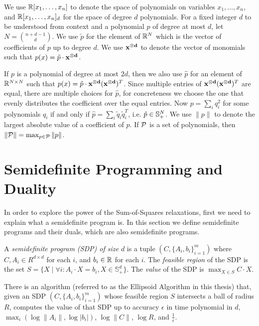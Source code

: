 We use $\mathbb R[x_1,\dots,x_n]$ to denote the space of polynomials on variables $x_1,\dots,x_n$, and $\mathbb R[x_1,\dots,x_n]_d$ for the space of degree $d$ polynomials.
For a fixed integer $d$ to be understood from context and a polynomial $p$ of degree at most $d$, let $N = \binom{n+d-1}{d}$. We use $\tilde{p}$ for the element of $\mathbb R^{N}$ which is the vector of coefficients of $p$ up to degree $d$. We use $\mathbf{x^{\otimes d}}$ to denote the vector of monomials such that $p(x) = \tilde{p} \cdot \mathbf{x^{\otimes d}}$.

If $p$ is a polynomial of degree at most $2d$, then we also use $\hat{p}$ for an element of $\mathbb R^{N \times N}$ such that $p(x) = \hat{p} \cdot \mathbf{x^{\otimes d}}(\mathbf{x^{\otimes d}})^T$. Since multiple entries of $\mathbf{x^{\otimes d}}(\mathbf{x^{\otimes d}})^T$ are equal, there are multiple choices for $\hat{p}$, for concreteness we choose the one that evenly distributes the coefficient over the equal entries. Now $p = \sum_i q_i^2$ for some polynomials $q_i$ if and only if $\hat{p} = \sum_i \tilde{q}_i\tilde{q}_i^T$, i.e. $\hat{p} \in \mathbb{S}^{N}_+$. We use $\|p\|$ to denote the largest absolute value of a coefficient of $p$. If $\mathcal P$ is a set of polynomials, then $\|\mathcal P\| = \max_{p \in \mathcal P} \|p\|$.

\section{Semidefinite Programming and Duality}
In order to explore the power of the Sum-of-Squares relaxations, first we need to explain what a semidefinite program is.
In this section we define semidefinite programs and their duals, which are also semidefinite programs.

\begin{definition}
A \emph{semidefinite program (SDP) of size $d$} is a tuple $(C,\{A_i, b_i\}_{i=1}^m)$ where $C,A_i \in R^{d \times d}$ for each $i$, and $b_i \in \mathbb R$ for each $i$.
The \emph{feasible region} of the SDP is the set $S = \{X \mid \forall i: A_i \cdot X = b_i, X \in \mathbb{S}_+^d\}$.
The \emph{value} of the SDP is $\max_{X\in S} C \cdot X$.
\end{definition}
\begin{fact}
There is an algorithm (referred to as the Ellipsoid Algorithm in this thesis) that, given an SDP $(C, \{A_i,b_i\}_{i=1}^m)$ whose feasible region $S$ intersects a ball of radius $R$, computes the value of that SDP up to accuracy $\epsilon$ in time polynomial in $d$, $\max_i\left(\log \|A_i\|, \log |b_i|\right)$, $\log \|C\|$, $\log R$, and $\frac{1}{\epsilon}$.
\end{fact}


